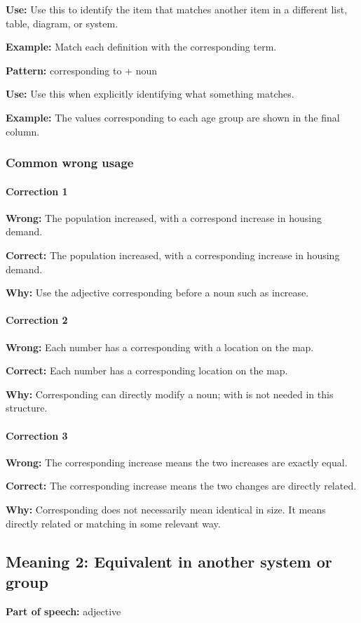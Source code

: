 \documentclass[11pt]{article}
\begin{document}
\textbf{Use:} Use this to identify the item that matches another item in a different list, table, diagram, or system.

\textbf{Example:} Match each definition with the corresponding term.

\textbf{Pattern:} corresponding to + noun

\textbf{Use:} Use this when explicitly identifying what something matches.

\textbf{Example:} The values corresponding to each age group are shown in the final column.

\subsubsection{Common wrong usage}
\paragraph{Correction 1}
\textbf{Wrong:} The population increased, with a correspond increase in housing demand.

\textbf{Correct:} The population increased, with a corresponding increase in housing demand.

\textbf{Why:} Use the adjective corresponding before a noun such as increase.

\paragraph{Correction 2}
\textbf{Wrong:} Each number has a corresponding with a location on the map.

\textbf{Correct:} Each number has a corresponding location on the map.

\textbf{Why:} Corresponding can directly modify a noun; with is not needed in this structure.

\paragraph{Correction 3}
\textbf{Wrong:} The corresponding increase means the two increases are exactly equal.

\textbf{Correct:} The corresponding increase means the two changes are directly related.

\textbf{Why:} Corresponding does not necessarily mean identical in size. It means directly related or matching in some relevant way.

\subsection{Meaning 2: Equivalent in another system or group}
\textbf{Part of speech:} adjective
\end{document}
